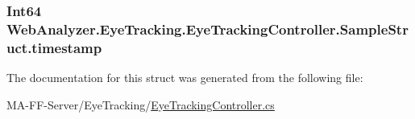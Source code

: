 \subsubsection[{timestamp}]{\setlength{\rightskip}{0pt plus 5cm}Int64 Web\+Analyzer.\+Eye\+Tracking.\+Eye\+Tracking\+Controller.\+Sample\+Struct.\+timestamp}\label{struct_web_analyzer_1_1_eye_tracking_1_1_eye_tracking_controller_1_1_sample_struct_aaaee2bfebc20de6cd2ec0b47d0e77e70}


The documentation for this struct was generated from the following file\+:\begin{DoxyCompactItemize}
\item 
M\+A-\/\+F\+F-\/\+Server/\+Eye\+Tracking/\hyperlink{_eye_tracking_controller_8cs}{Eye\+Tracking\+Controller.\+cs}\end{DoxyCompactItemize}

